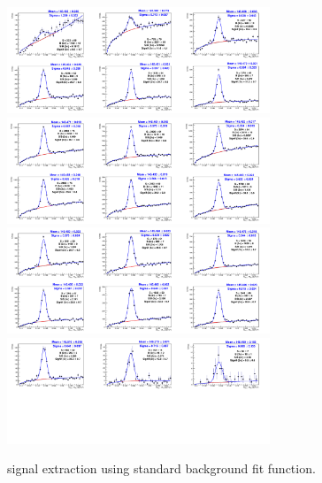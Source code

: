 \begin{figure}[!h]
\begin{center}
\includegraphics[width=0.7\textwidth]{figures/Dstar/pp13TeV/multi_trial/Mass_Spectra_stdBkg_1-4GeV.png} 
\includegraphics[width=0.7\textwidth]{figures/Dstar/pp13TeV/multi_trial/Mass_Spectra_stdBkg_4-7GeV.png}
\includegraphics[width=0.7\textwidth]{figures/Dstar/pp13TeV/multi_trial/Mass_Spectra_stdBkg_7-16GeV.png}
\includegraphics[width=0.7\textwidth]{figures/Dstar/pp13TeV/multi_trial/Mass_Spectra_stdBkg_16-50GeV.png} 
\caption{\Dstar signal extraction using standard background fit function.}
\label{fig:DstarYield_stdbkg}
\end{center}
\end{figure}


